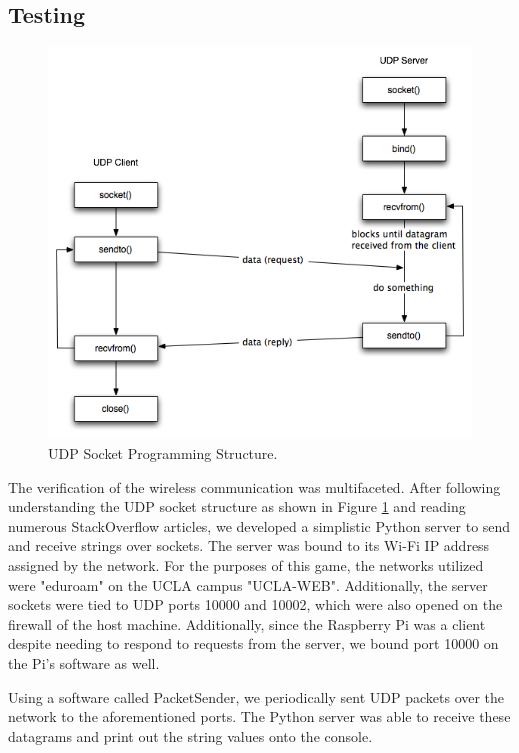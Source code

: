 \documentclass[titlepage, 12pt]{scrartcl}
\begin{document}
    \subsection{Testing}
        \begin{figure}[ht]
            \centering
            \includegraphics[scale=0.6]{figures/udp_structure.jpg}
            \caption{UDP Socket Programming Structure. \cite{campbell_2012}}
            \label{fig:udp_structure}
        \end{figure}
        The verification of the wireless communication was multifaceted. After following understanding the UDP socket structure as shown in Figure \ref{fig:udp_structure} and reading numerous StackOverflow articles, we developed a simplistic Python server to send and receive strings over sockets. The server was bound to its Wi-Fi IP address assigned by the network. For the purposes of this game, the networks utilized were "eduroam" on the UCLA campus "UCLA-WEB". Additionally, the server sockets were tied to UDP ports 10000 and 10002, which were also opened on the firewall of the host machine. Additionally, since the Raspberry Pi was a client despite needing to respond to requests from the server, we bound port 10000 on the Pi's software as well. \par
        Using a software called PacketSender, we periodically sent UDP packets over the network to the aforementioned ports. The Python server was able to receive these datagrams and print out the string values onto the console. \par
\end{document}
